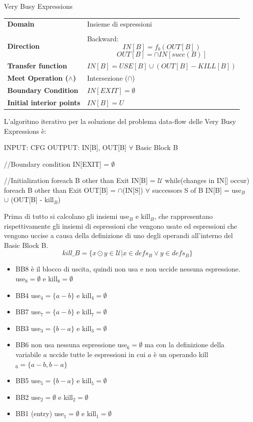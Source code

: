 \documentclass[a4paper, 9pt]{article}
\begin{document}
\begin{frameworkdfa}{Very Busy Expressions}
    \centering
    \begin{tabularx}{\textwidth}{>{\bfseries\sffamily}l | X}
        Domain & Insieme di espressioni \\
        \\
        \hline
        Direction & Backward: $$IN[B] = f_b(OUT[B])$$  $$OUT[B] = \cap IN[succ(B)]$$ \\
        \hline
        Transfer function & $IN[B] = USE[B] \cup (OUT[B] - KILL[B])$ \\
        \hline
        Meet Operation ($\wedge$) & Intersezione ($\cap$) \\
        \hline
        Boundary Condition & $IN[EXIT] = \emptyset$ \\
        \hline
        Initial interior points & $IN[B] = U$ \\
    \end{tabularx}
\end{frameworkdfa}
L'algoritmo iterativo per la soluzione del problema data-flow delle Very Busy Expressions è:
\begin{myalgo}[style=mystyle]
INPUT: CFG
OUTPUT: IN[B], OUT[B] $\forall$ Basic Block B 

//Boundary condition 
IN[EXIT] = $\emptyset$

//Initialization
foreach B other than Exit 
    IN[B] = $\mathcal{U}$
while(changes in IN[] occur){
    foreach B other than Exit {
        OUT[B] = $\cap$(IN[S]) $\forall$ successors S of B
        IN[B] = use$_B$ $\cup$ (OUT[B] - kill$_B$)
    }
}
\end{myalgo}
Prima di tutto si calcolano gli insiemi use$_B$ e kill$_B$, che rappresentano rispettivamente gli insiemi di espressioni che vengono usate ed espressioni che vengono uccise a causa della definizione di uno degli operandi all'interno del Basic Block B.$$kill\_B = \{x \odot  y \in \mathcal{U}| x \in defs_B \vee  y \in defs_B \}$$ 
\begin{itemize}
    \item BB8 è il blocco di uscita, quindi non usa e non uccide nessuna espressione. use$_8=\emptyset$ e kill$_8=\emptyset$
    \item BB4 use$_4=\{a-b\}$ e kill$_4=\emptyset$
    \item BB7 use$_7=\{a -b\}$ e kill$_7=\emptyset$
    \item BB3 use$_3=\{b -a\}$ e kill$_3=\emptyset$
    \item BB6 non usa nessuna espressione use$_6=\emptyset$ ma con la definizione della variabile $a$ uccide tutte le espressioni in cui $a$ è un operando kill$_6=\{a -b, b- a\}$
    \item BB5 use$_5=\{b -a\}$ e kill$_5=\emptyset$
    \item BB2 use$_2=\emptyset$ e kill$_2=\emptyset$
    \item BB1 (entry) use$_1=\emptyset$ e kill$_1=\emptyset$
\end{itemize}
\end{document}
